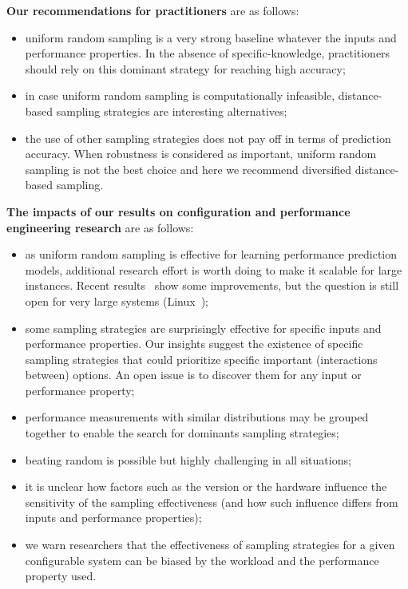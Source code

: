 \textbf{Our recommendations for practitioners} are as follows:
\begin{itemize}
    \item uniform random sampling is a very strong baseline whatever the inputs and performance properties. In the absence of specific-knowledge, practitioners should rely on this dominant strategy for reaching high accuracy; %
    \item in case uniform random sampling is computationally infeasible, distance-based sampling strategies are interesting alternatives;
    \item the use of other sampling strategies does not pay off in terms of prediction accuracy. When robustness is considered as important, uniform random sampling is not the best choice and here we recommend diversified distance-based sampling.
\end{itemize}

\textbf{The impacts of our results on configuration and performance engineering research} are as follows:
\begin{itemize}
    \item as uniform random sampling is effective for learning performance prediction models, additional research effort is worth doing to make it scalable for large instances. Recent results~\cite{DBLP:conf/splc/MunozOPFB19,DBLP:conf/splc/OhGB19,DBLP:conf/icse/HeradioFME19,plazar2019} show some improvements, but the question is still open for very large systems (\eg Linux~\cite{acher:hal-02314830});
    \item some sampling strategies are surprisingly effective for specific inputs and performance properties. Our insights suggest the existence of specific sampling strategies that could prioritize specific important (interactions between) options. An open issue is to discover them for any input or performance property; 
   \item performance measurements with similar distributions may be grouped together to enable the search for dominants sampling strategies; %
    \item beating random is possible but highly challenging in all situations; 
    \item it is unclear how factors such as the version or the hardware influence the sensitivity of the sampling effectiveness (and how such influence differs from inputs and performance properties); 
    \item we warn researchers that the effectiveness of sampling strategies for a given configurable system can be biased by the workload and the performance property used. 
\end{itemize}

